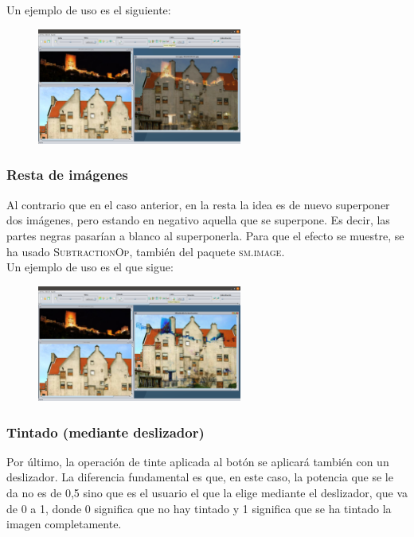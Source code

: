 \documentclass[11pt,a4paper]{article}
\begin{document}
Un ejemplo de uso es el siguiente:

\begin{figure}[H]
\centering
	\includegraphics[width=0.6\textwidth]{img/suma.png}
\end{figure}

\subsubsection{Resta de imágenes}
Al contrario que en el caso anterior, en la resta la idea es de nuevo superponer dos imágenes, pero estando en negativo aquella que se superpone. Es decir, las partes negras pasarían a blanco al superponerla. Para que el efecto se muestre, se ha usado \textsc{SubtractionOp}, también del paquete \textsc{sm.image}.\\

Un ejemplo de uso es el que sigue:

\begin{figure}[H]
\centering
	\includegraphics[width=0.6\textwidth]{img/resta.png}
\end{figure}

\subsubsection{Tintado (mediante deslizador)}
Por último, la operación de tinte aplicada al botón se aplicará también con un deslizador. La diferencia fundamental es que, en este caso, la potencia que se le da no es de 0,5 sino que es el usuario el que la elige mediante el deslizador, que va de 0 a 1, donde 0 significa que no hay tintado y 1 significa que se ha tintado la imagen completamente.\\
\end{document}
